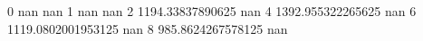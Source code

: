 0 nan nan
1 nan nan
2 1194.33837890625 nan
4 1392.955322265625 nan
6 1119.0802001953125 nan
8 985.8624267578125 nan

